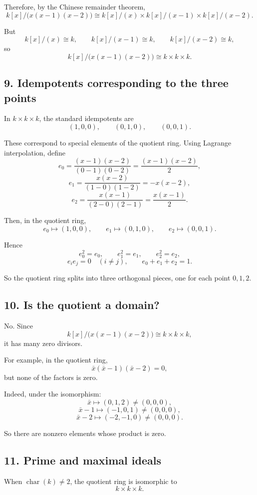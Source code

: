 \documentclass[12pt,a4paper]{article}
\theoremstyle{notespace}
\begin{document}
Therefore, by the Chinese remainder theorem,
\[
k[x]/\bigl(x(x-1)(x-2)\bigr)
\cong
k[x]/(x)\times k[x]/(x-1)\times k[x]/(x-2).
\]

But
\[
k[x]/(x)\cong k,\qquad
k[x]/(x-1)\cong k,\qquad
k[x]/(x-2)\cong k,
\]
so
\[
k[x]/\bigl(x(x-1)(x-2)\bigr)\cong k\times k\times k.
\]

\subsection*{9. Idempotents corresponding to the three points}

In \(k\times k\times k\), the standard idempotents are
\[
(1,0,0),\qquad (0,1,0),\qquad (0,0,1).
\]

These correspond to special elements of the quotient ring. Using Lagrange interpolation, define
\[
e_0=\frac{(x-1)(x-2)}{(0-1)(0-2)}=\frac{(x-1)(x-2)}{2},
\]
\[
e_1=\frac{x(x-2)}{(1-0)(1-2)}=-x(x-2),
\]
\[
e_2=\frac{x(x-1)}{(2-0)(2-1)}=\frac{x(x-1)}{2}.
\]

Then, in the quotient ring,
\[
e_0\longmapsto (1,0,0),\qquad
e_1\longmapsto (0,1,0),\qquad
e_2\longmapsto (0,0,1).
\]

Hence
\[
e_0^2=e_0,\qquad e_1^2=e_1,\qquad e_2^2=e_2,
\]
\[
e_ie_j=0\quad (i\neq j),
\qquad
e_0+e_1+e_2=1.
\]

So the quotient ring splits into three orthogonal pieces, one for each point \(0,1,2\).

\subsection*{10. Is the quotient a domain?}

No. Since
\[
k[x]/\bigl(x(x-1)(x-2)\bigr)\cong k\times k\times k,
\]
it has many zero divisors.

For example, in the quotient ring,
\[
\bar x(\bar x-1)(\bar x-2)=0,
\]
but none of the factors is zero.

Indeed, under the isomorphism:
\[
\bar x\longmapsto (0,1,2)\neq (0,0,0),
\]
\[
\bar x-1\longmapsto (-1,0,1)\neq (0,0,0),
\]
\[
\bar x-2\longmapsto (-2,-1,0)\neq (0,0,0).
\]

So there are nonzero elements whose product is zero.

\subsection*{11. Prime and maximal ideals}

When \(\operatorname{char}(k)\neq 2\), the quotient ring is isomorphic to
\[
k\times k\times k.
\]
\end{document}
